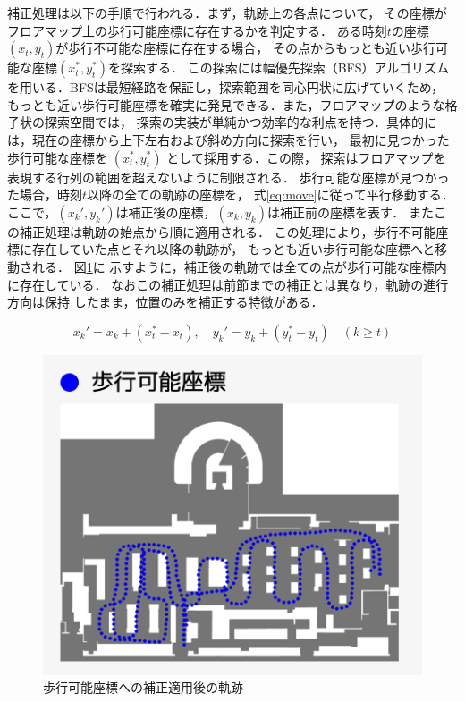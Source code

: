 補正処理は以下の手順で行われる．まず，軌跡上の各点について，
その座標がフロアマップ上の歩行可能座標に存在するかを判定する．
ある時刻$t$の座標$(x_t, y_t)$が歩行不可能な座標に存在する場合，
その点からもっとも近い歩行可能な座標$(x_t^*, y_t^*)$を探索する．
この探索には幅優先探索（BFS）アルゴリズムを用いる．BFSは最短経路を保証し，探索範囲を同心円状に広げていくため，
もっとも近い歩行可能座標を確実に発見できる．また，フロアマップのような格子状の探索空間では，
探索の実装が単純かつ効率的な利点を持つ．具体的には，現在の座標から上下左右および斜め方向に探索を行い，
最初に見つかった歩行可能な座標を $(x_t^*, y_t^*)$ として採用する．この際，
探索はフロアマップを表現する行列の範囲を超えないように制限される．
歩行可能な座標が見つかった場合，時刻$t$以降の全ての軌跡の座標を，
式\ref{eq:move}に従って平行移動する．
ここで，$(x_k', y_k')$は補正後の座標，$(x_k, y_k)$は補正前の座標を表す．
またこの補正処理は軌跡の始点から順に適用される．%
この処理により，歩行不可能座標に存在していた点とそれ以降の軌跡が，
もっとも近い歩行可能な座標へと移動される．
図\ref{fig:walkable-points}に
示すように，補正後の軌跡では全ての点が歩行可能な座標内に存在している．
なおこの補正処理は前節までの補正とは異なり，軌跡の進行方向は保持
したまま，位置のみを補正する特徴がある．




\begin{equation}
  \label{eq:move}
x_k' = x_k + (x_t^* - x_t), \quad y_k' = y_k + (y_t^* - y_t) \quad (k \geq t)
\end{equation}


\begin{figure}[H]
    \centering
    \includegraphics[width=\linewidth]{../image/walkable-points.jpg}
    \caption{歩行可能座標への補正適用後の軌跡}    \label{fig:walkable-points}
\end{figure}

